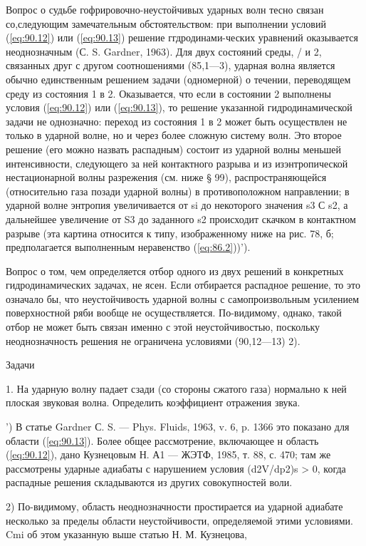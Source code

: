 Вопрос о судьбе гофрировочно-неустойчивых ударных волн тесно связан
со,следующим замечательным обстоятельством: при выполнении условий
(\ref{eq:90.12}) или (\ref{eq:90.13}) решение ггдродинами-ческих уравнений
оказывается неоднозначным (С. S.  Gardner, 1963). Для двух состояний среды, / и
2, связанных друг с другом соотношениями (85,1—3), ударная волна является
обычно единственным решением задачи (одномерной) о течении, переводящем среду
из состояния 1 в 2.  Оказывается, что если в состоянии 2 выполнены условия
(\ref{eq:90.12}) или (\ref{eq:90.13}), то решение указанной гидродинамической
задачи не однозначно: переход из состояния 1 в 2 может быть осуществлен не
только в ударной волне, но и через более сложную систему волн. Это второе
решение (его можно назвать распадным) состоит из ударной волны меньшей
интенсивности, следующего за ней контактного разрыва и из изэнтропической
нестационарной волны разрежения (см. ниже § 99), распространяющейся
(относительно газа позади ударной волны) в противоположном направлении; в
ударной волне энтропия увеличивается от si до некоторого значения s3 С s2, а
дальнейшее увеличение от S3 до заданного s2 происходит скачком в контактном
разрыве (эта картина относится к типу, изображенному ниже на рис. 78, б;
предполагается выполненным неравенство (\ref{eq:86.2}))').

Вопрос о том, чем определяется отбор одного из двух решений в конкретных
гидродинамических задачах, не ясен. Если отбирается распадное решение, то это
означало бы, что неустойчивость ударной волны с самопроизвольным усилением
поверхностной ряби вообще не осуществляется. По-видимому, однако, такой отбор
не может быть связан именно с этой неустойчивостью, поскольку неоднозначность
решения не ограничена условиями (90,12—13) 2).

Задачи

1. На ударную волну падает сзади (со стороны сжатого газа) нормально к ней
плоская звуковая волна. Определить коэффициент отражения звука.

') В статье Gardner С. S. — Phys. Fluids, 1963, v. 6, p. 1366 это показано для
области (\ref{eq:90.13}). Более общее рассмотрение, включающее н область
(\ref{eq:90.12}), дано Кузнецовым Н. А1 — ЖЭТФ, 1985, т. 88, с. 470; там же
рассмотрены ударные адиабаты с нарушением условия (d2V/dp2)s > 0, когда
распадные решения складываются из других совокупностей воли.

2) По-видимому, область неоднозначности простирается иа ударной адиабате
несколько за пределы области неустойчивости, определяемой этими условиями. Cmi
об этом указанную выше статью Н. М. Кузнецова,


